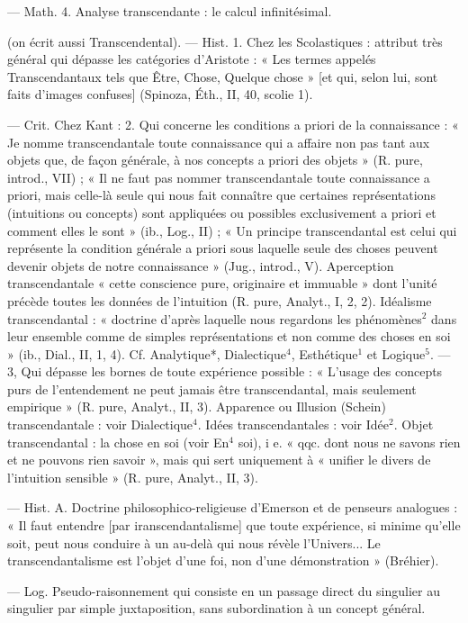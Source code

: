 \begin{itemize}[leftmargin=1cm, label=, itemsep=1pt]
— Math. 4. Analyse transcendante : le calcul infinitésimal.

 (on écrit aussi Transcendental). — Hist. 1. Chez les Scolastiques : attribut très général qui
dépasse les catégories d’Aristote :
« Les termes appelés Transcendantaux tels que Être, Chose, Quelque
chose » [et qui, selon lui, sont faits
d'images confuses] (Spinoza, Éth.,
II, 40, scolie 1).

— Crit. Chez Kant : 2. Qui concerne les conditions a priori de la
connaissance : « Je nomme transcendantale toute connaissance qui a
affaire non pas tant aux objets que,
de façon générale, à nos concepts a
priori des objets » (R. pure, introd.,
VII) ; « Il ne faut pas nommer transcendantale toute connaissance a priori, mais celle-là seule qui nous
fait connaître que certaines représentations (intuitions ou concepts)
sont appliquées ou possibles exclusivement a priori et comment elles
le sont » (ib., Log., II) ; « Un principe transcendantal est celui qui
représente la condition générale
a priori sous laquelle seule des
choses peuvent devenir objets de
notre connaissance » (Jug., introd.,
V). Aperception transcendantale
« cette conscience pure, originaire et
immuable » dont l'unité précède
toutes les données de l'intuition
(R. pure, Analyt., I, 2, 2). Idéalisme transcendantal : « doctrine
d’après laquelle nous regardons les
phénomènes$^2$ dans leur ensemble
comme de simples représentations
et non comme des choses en soi »
(ib., Dial., II, 1, 4). Cf. Analytique*,
Dialectique$^4$, Esthétique$^1$ et Logique$^5$.
— 3, Qui dépasse les bornes de
toute expérience possible : « L'usage
des concepts purs de l’entendement
ne peut jamais être transcendantal,
mais seulement empirique » (R. pure,
Analyt., II, 3). Apparence ou Illusion (Schein) transcendantale : voir
Dialectique$^4$. Idées transcendantales :
voir Idée$^2$. Objet transcendantal : la
chose en soi (voir En$^4$ soi), i e.
« qqc. dont nous ne savons rien et
ne pouvons rien savoir », mais qui
sert uniquement à « unifier le divers
de l'intuition sensible » (R. pure,
Analyt., II, 3).

 — Hist. A. Doctrine philosophico-religieuse d’Emerson et de penseurs analogues : « Il
faut entendre [par iranscendantalisme] que toute expérience, si minime qu’elle soit, peut nous conduire
à un au-delà qui nous révèle l'Univers... Le transcendantalisme est
l’objet d’une foi, non d’une démonstration » (Bréhier).

 — Log. Pseudo-raisonnement qui consiste en un passage
direct du singulier au singulier par
simple juxtaposition, sans subordination à un concept général.


\end{itemize}
